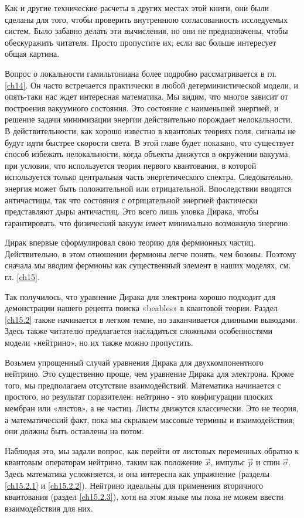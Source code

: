 \documentclass[main.tex]{subfiles}
\begin{document}
Как и другие технические расчеты в других местах этой книги, они были сделаны для того, чтобы проверить внутреннюю согласованность исследуемых систем. Было забавно делать эти вычисления, но они не предназначены, чтобы обескуражить читателя. Просто пропустите их, если вас больше интересует общая картина.

Вопрос о локальности гамильтониана более подробно рассматривается в гл. \ref{ch14}. Он часто встречается практически в любой детерминистической модели, и опять-таки нас ждет интересная математика. Мы видим, что многое зависит от построения вакуумного состояния. Это состояние с наименьшей энергией, и решение задачи минимизации энергии действительно порождает нелокальности. В действительности, как хорошо известно в квантовых теориях поля, сигналы не будут идти быстрее скорости света. В этой главе будет показано, что существует способ избежать нелокальности, когда объекты движутся в окружении вакуума, при условии, что используется теория первого квантования, в которой используется только центральная часть энергетического спектра. Следовательно, энергия может быть положительной или отрицательной. Впоследствии вводятся античастицы, так что состояния с отрицательной энергией фактически представляют дыры античастиц. Это всего лишь уловка Дирака, чтобы гарантировать, что физический вакуум имеет минимально возможную энергию.

Дирак впервые сформулировал свою теорию для фермионных частиц. Действительно, в этом отношении фермионы легче понять, чем бозоны. Поэтому сначала мы вводим фермионы как существенный элемент в наших моделях, см. гл. \ref{ch15}.

Так получилось, что уравнение Дирака для электрона хорошо подходит для демонстрации нашего рецепта поиска «beables» в квантовой теории. Раздел \ref{ch15.2} также начинается в легком темпе, но заканчивается длинными выводами. Здесь также читателю предлагается насладиться сложными особенностями модели «нейтрино», но их также можно пропустить.

Возьмем упрощенный случай уравнения Дирака для двухкомпонентного нейтрино. Это существенно проще, чем уравнение Дирака для электрона. Кроме того, мы предполагаем отсутствие взаимодействий. Математика начинается с простого, но результат поразителен: нейтрино - это конфигурации плоских мембран или «листов», а не частиц. Листы движутся классически. Это не теория, а математический факт, пока мы скрываем массовые термины и взаимодействия; они должны быть оставлены на потом.

Наблюдая это, мы задали вопрос, как перейти от листовых переменных обратно к квантовым операторам нейтрино, таким как положение $\vec x$, импульс $\vec p$ и спин $\vec \sigma$. Здесь математика усложняется, и она интересна как упражнение (разделы \ref{ch15.2.1} и \ref{ch15.2.2}). Нейтрино идеальны для применения вторичного квантования (раздел \ref{ch15.2.3}), хотя на этом языке мы пока не можем ввести взаимодействия для них.
\end{document}

